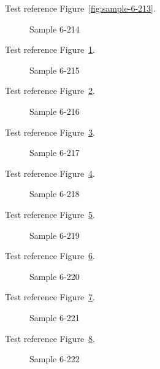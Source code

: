 Test reference Figure~\ref{fig:sample-6-213}.

\begin{figure}[tbhp]
\caption{Sample 6-214}
\label{fig:sample-6-214}
\end{figure}

Test reference Figure~\ref{fig:sample-6-214}.

\begin{figure}[tbhp]
\caption{Sample 6-215}
\label{fig:sample-6-215}
\end{figure}

Test reference Figure~\ref{fig:sample-6-215}.

\begin{figure}[tbhp]
\caption{Sample 6-216}
\label{fig:sample-6-216}
\end{figure}

Test reference Figure~\ref{fig:sample-6-216}.

\begin{figure}[tbhp]
\caption{Sample 6-217}
\label{fig:sample-6-217}
\end{figure}

Test reference Figure~\ref{fig:sample-6-217}.

\begin{figure}[tbhp]
\caption{Sample 6-218}
\label{fig:sample-6-218}
\end{figure}

Test reference Figure~\ref{fig:sample-6-218}.

\begin{figure}[tbhp]
\caption{Sample 6-219}
\label{fig:sample-6-219}
\end{figure}

Test reference Figure~\ref{fig:sample-6-219}.

\begin{figure}[tbhp]
\caption{Sample 6-220}
\label{fig:sample-6-220}
\end{figure}

Test reference Figure~\ref{fig:sample-6-220}.

\begin{figure}[tbhp]
\caption{Sample 6-221}
\label{fig:sample-6-221}
\end{figure}

Test reference Figure~\ref{fig:sample-6-221}.

\begin{figure}[tbhp]
\caption{Sample 6-222}
\label{fig:sample-6-222}
\end{figure}

